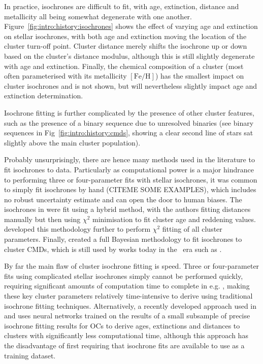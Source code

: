 In practice, isochrones are difficult to fit, with age, extinction, distance and metallicity all being somewhat degenerate with one another. Figure~\ref{fig:intro:history:isochrones} shows the effect of varying age and extinction on stellar isochrones, with both age and extinction moving the location of the cluster turn-off point. Cluster distance merely shifts the isochrone up or down based on the cluster's distance modulus, although this is still slightly degenerate with age and extinction. Finally, the chemical composition of a cluster (most often parameterised with its metallicity $\left[\text{Fe}/\text{H}\right]$) has the smallest impact on cluster isochrones and is not shown, but will nevertheless slightly impact age and extinction determination.

Isochrone fitting is further complicated by the presence of other cluster features, such as the presence of a binary sequence due to unresolved binaries (see binary sequences in Fig~\ref{fig:intro:history:cmds}, showing a clear second line of stars sat slightly above the main cluster population).

Probably unsurprisingly, there are hence many methods used in the literature to fit isochrones to data. Particularly as computational power is a major hindrance to performing three or four-parameter fits with stellar isochrones, it was common to simply fit isochrones by hand (CITEME SOME EXAMPLES), which includes no robust uncertainty estimate and can open the door to human biases. The isochrones in \cite{kharchenko_global_2013} were fit using a hybrid method, with the authors fitting distances manually but then using $\chi^2$ minimisation to fit cluster age and reddening values. \cite{yen_reanalysis_2018} developed this methodology further to perform $\chi^2$ fitting of all cluster parameters. Finally, \cite{hippel_inverting_2006} created a full Bayesian methodology to fit isochrones to cluster CMDs, which is still used by works today in the \gaia\ era such as \cite{bossini_age_2019}.

By far the main flaw of cluster isochrone fitting is speed. Three or four-parameter fits using complicated stellar isochrones simply cannot be performed quickly, requiring significant amounts of computation time to complete in e.g. \cite{yen_reanalysis_2018}, making these key cluster parameters relatively time-intensive to derive using traditional isochrone fitting techniques. Alternatively, a recently developed approach used in \cite{cantat-gaudin_painting_2020} and \cite{kounkel_untangling_2020} uses neural networks trained on the results of a small subsample of precise isochrone fitting results for OCs to derive ages, extinctions and distances to clusters with significantly less computational time, although this approach has the disadvantage of first requiring that isochrone fits are available to use as a training dataset.


